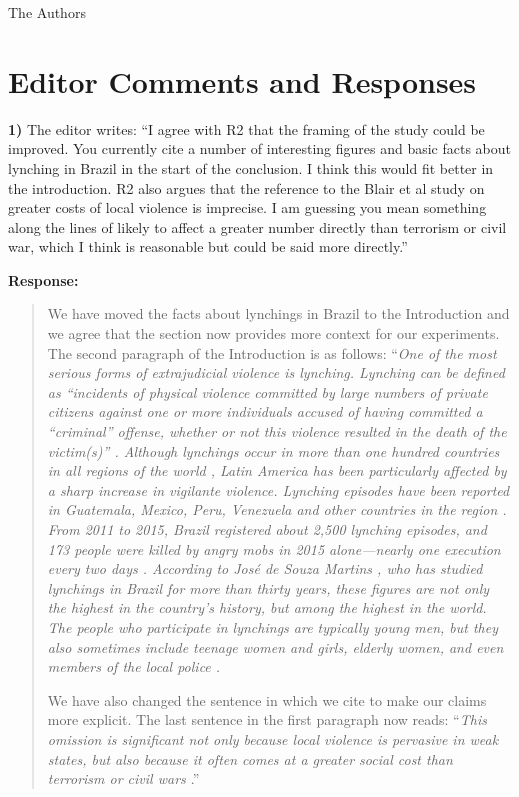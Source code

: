 \documentclass[a4paper,12pt]{article}
\begin{document}
\noindent The Authors

\newpage

\section*{Editor Comments and Responses}

\textbf{1)} The editor writes: ``I agree with R2 that the framing of the study
could be improved. You currently cite a number of interesting figures and basic
facts about lynching in Brazil in the start of the conclusion. I think this
would fit better in the introduction. R2 also argues that the reference to the
Blair et al study on greater costs of local violence is imprecise. I am
guessing you mean something along the lines of likely to affect a greater
number directly than terrorism or civil war, which I think is reasonable but
could be said more directly.''

\vspace{.3cm}

\noindent \textbf{Response:} 
\begin{quote}

We have moved the facts about lynchings in Brazil to the Introduction and we
agree that the section now provides more context for our experiments. The
second paragraph of the Introduction is as follows: ``\textit{One of the most
serious forms of extrajudicial violence is lynching. Lynching can be defined
as ``incidents of physical violence committed by large numbers of private
citizens against one or more individuals accused of having committed a
``criminal'' offense, whether or not this violence resulted in the death of
the victim(s)'' \citep[645]{godoy2004justice}. Although lynchings occur in
more than one hundred countries in all regions of the world
\citep{jung2020lynching,smith2019contradictions}, Latin America has been
particularly affected by a sharp increase in vigilante violence. Lynching
episodes have been reported in Guatemala, Mexico, Peru, Venezuela and other
countries in the region \citep{barbara2015vigilantes, cruz2019determinants,
godoy2004justice}. From 2011 to 2015, Brazil registered about 2,500 lynching
episodes, and 173 people were killed by angry mobs in 2015 alone---nearly one
execution every two days \citep{barbara2015vigilantes, oliveira2016mob}.
According to José de Souza Martins \citeyearpar{martins2015linchamentos}, who
has studied lynchings in Brazil for more than thirty years, these figures are
not only the highest in the country's history, but among the highest in the
world. The people who participate in lynchings are typically young men, but
they also sometimes include teenage women and girls, elderly women, and even
members of the local police \citep{moura2017linchamentos}.}

We have also changed the sentence in which we cite \citet{blair2017predicting}
to make our claims more explicit. The last sentence in the first paragraph now
reads: ``\textit{This omission is significant not only because local violence
is pervasive in weak states, but also because it often comes at a greater
social cost than terrorism or civil wars \citep{blair2017predicting}}.''

\end{quote}
\end{document}
